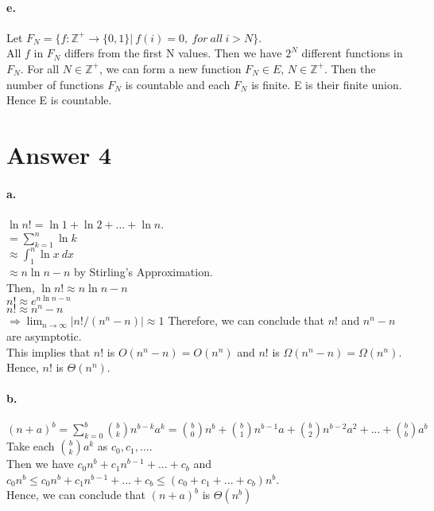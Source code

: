 \documentclass[11pt]{article}
\begin{document}
\paragraph{e.}
    Let $F_N = \{f:\mathbb{Z^+} \rightarrow \{0,1\}| \ f(i)=0, \ for \ all \ i>N\}$.\\
    All $f$ in $F_N$ differs from the first N values. Then we have $2^N$ different functions in $F_N$. For all $N \in \mathbb{Z^+}$, we can form a new function $F_N \in E$, $N \in \mathbb{Z^+}$. Then the number of functions $F_N$ is countable and each $F_N$ is finite. E is their finite union.\\
    Hence E is countable.
    
    
    
\section*{Answer 4}
\paragraph{a.}
    $\ln{n!} = \ln 1+\ln 2+...+\ln n$.\\
    $= \sum_{k=1}^{n}\ln k $\\
    $\approx \int_{1}^{n} \ln x \ dx$\\
    $\approx n\ln n-n$ by Stirling's Approximation.\\
    Then, $\ln{n!} \approx n \ln{n}-n$\\
    $n! \approx e^{n\ln{n}-n}$\\
    $n! \approx n^n -n$\\
    $\Rightarrow \lim_{n\to\infty} |n!/(n^n-n)| \approx 1$
    Therefore, we can conclude that $n!$ and $n^n-n$ are asymptotic.\\
    This implies that $n!$ is $O(n^n-n) = O(n^n)$ and $n!$ is $\Omega(n^n-n) = \Omega(n^n)$.\\
    Hence, $n!$ is $\Theta(n^n)$.
    
\paragraph{b.}
    $(n+a)^b = \sum_{k=0}^{b}\binom{b}{k}n^{b-k}a^k =  \binom{b}{0}n^b+\binom{b}{1}n^{b-1}a +\binom{b}{2}n^{b-2}a^2+...+\binom{b}{b}a^b $\\
    Take each $\binom{b}{k}a^k$ as $c_0, c_1, ...$.\\
    Then we have $c_0n^b+c_1n^{b-1}+...+c_b$ and \\
    $c_0n^b \leq c_0n^b+c_1n^{b-1}+...+c_b \leq  (c_0+c_1+...+c_b)n^b$.\\
    Hence, we can conclude that $(n+a)^b$ is $\Theta(n^b)$
    
\end{document}
